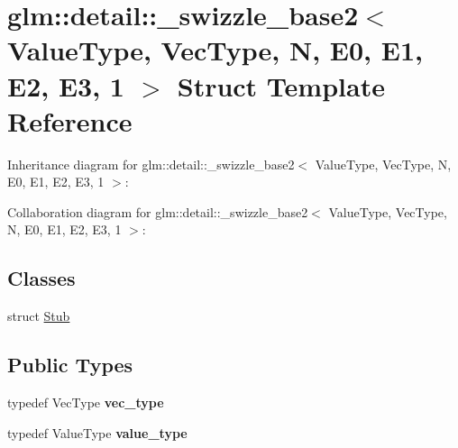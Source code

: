 \hypertarget{structglm_1_1detail_1_1__swizzle__base2_3_01_value_type_00_01_vec_type_00_01_n_00_01_e0_00_01_e1_00_01_e2_00_01_e3_00_011_01_4}{}\section{glm\+:\+:detail\+:\+:\+\_\+swizzle\+\_\+base2$<$ Value\+Type, Vec\+Type, N, E0, E1, E2, E3, 1 $>$ Struct Template Reference}
\label{structglm_1_1detail_1_1__swizzle__base2_3_01_value_type_00_01_vec_type_00_01_n_00_01_e0_00_01_e1_00_01_e2_00_01_e3_00_011_01_4}


Inheritance diagram for glm\+:\+:detail\+:\+:\+\_\+swizzle\+\_\+base2$<$ Value\+Type, Vec\+Type, N, E0, E1, E2, E3, 1 $>$\+:


Collaboration diagram for glm\+:\+:detail\+:\+:\+\_\+swizzle\+\_\+base2$<$ Value\+Type, Vec\+Type, N, E0, E1, E2, E3, 1 $>$\+:
\subsection*{Classes}
\begin{DoxyCompactItemize}
\item 
struct \hyperlink{structglm_1_1detail_1_1__swizzle__base2_3_01_value_type_00_01_vec_type_00_01_n_00_01_e0_00_01_e1d74529ea3036199f62a3c164ac7e92d9}{Stub}
\end{DoxyCompactItemize}
\subsection*{Public Types}
\begin{DoxyCompactItemize}
\item 
\hypertarget{structglm_1_1detail_1_1__swizzle__base2_3_01_value_type_00_01_vec_type_00_01_n_00_01_e0_00_01_e1_00_01_e2_00_01_e3_00_011_01_4_ad2442863b7e1573d71bf4af4e717a819}{}typedef Vec\+Type {\bfseries vec\+\_\+type}\label{structglm_1_1detail_1_1__swizzle__base2_3_01_value_type_00_01_vec_type_00_01_n_00_01_e0_00_01_e1_00_01_e2_00_01_e3_00_011_01_4_ad2442863b7e1573d71bf4af4e717a819}

\item 
\hypertarget{structglm_1_1detail_1_1__swizzle__base2_3_01_value_type_00_01_vec_type_00_01_n_00_01_e0_00_01_e1_00_01_e2_00_01_e3_00_011_01_4_a6af089fbf34a725330bea0092ee34768}{}typedef Value\+Type {\bfseries value\+\_\+type}\label{structglm_1_1detail_1_1__swizzle__base2_3_01_value_type_00_01_vec_type_00_01_n_00_01_e0_00_01_e1_00_01_e2_00_01_e3_00_011_01_4_a6af089fbf34a725330bea0092ee34768}

\end{DoxyCompactItemize}
